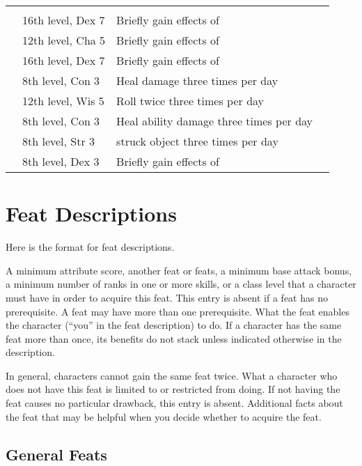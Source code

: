 {\begin{longtabu}{>{\lcol}p{15em} >{\lcol}p{15em} >{\lcol}X >{\lcol}p{10em}}
\midrule
{} &  &  \\
 & 16th level, Dex 7 & Briefly gain effects of  \\
 & 12th level, Cha 5 & Briefly gain effects of  \\
 & 16th level, Dex 7 & Briefly gain effects of  \\
 & 8th level, Con 3 & Heal damage three times per day \\
 & 12th level, Wis 5 & Roll twice three times per day \\
 & 8th level, Con 3 & Heal ability damage three times per day \\
 & 8th level, Str 3 &  struck object three times per day \\
 & 8th level, Dex 3 & Briefly gain effects of  \\
\end{longtabu}}

\section{Feat Descriptions}
Here is the format for feat descriptions.

 A minimum attribute score, another feat or feats, a minimum base attack bonus, a minimum number of ranks in one or more skills, or a class level that a character must have in order to acquire this feat. This entry is absent if a feat has no prerequisite. A feat may have more than one prerequisite.
 What the feat enables the character (``you'' in the feat description) to do. If a character has the same feat more than once, its benefits do not stack unless indicated otherwise in the description.
\par In general, characters cannot gain the same feat twice.
 What a character who does not have this feat is limited to or restricted from doing. If not having the feat causes no particular drawback, this entry is absent.
 Additional facts about the feat that may be helpful when you decide whether to acquire the feat.

\subsection{General Feats}


